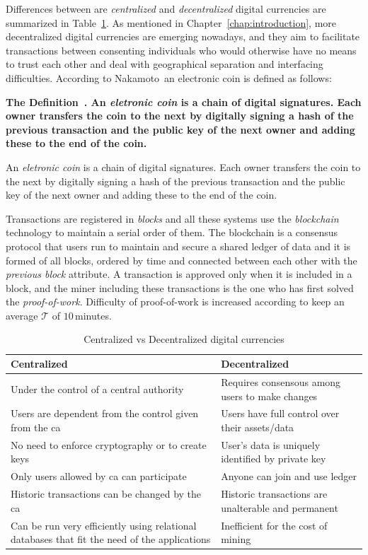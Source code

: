 \documentclass[USenglish]{uit-thesis}
\newcommand{\definition}[1]{%
  \refstepcounter{definition}%
  \par\noindent\textbf{The Definition~\thedefinition. #1}%
  \addcontentsline{def}{definition}
    {\protect\numberline{\thechapter.\thedefinition}#1}\par%
}
\begin{document}
Differences between are \emph{centralized}
and \emph{decentralized} digital currencies
are summarized in Table~\ref{tab:centralized_vs_decentralized}.
As mentioned in Chapter~\ref{chap:introduction}, more decentralized
digital currencies are emerging nowadays, and they aim
to facilitate transactions between consenting individuals who would otherwise
have no means to trust each other and deal with geographical separation and 
interfacing difficulties.
According to Nakamoto\,\cite{Nakamoto_bitcoin} an electronic coin is defined as
follows:
\definition{An \emph{eletronic coin} is a chain of digital signatures.
	Each owner transfers the coin to the next by digitally signing a hash of
	the previous transaction and the public key of the next owner and adding
	these to the end of the coin.}
Transactions are registered in \emph{blocks} and all these systems use the
\emph{blockchain} technology to maintain a serial order of them.
The blockchain is a consensus protocol that users run to maintain and secure a
shared ledger of data and it is formed of all blocks, ordered by time and connected
between each other with the \emph{previous block} attribute. A transaction is approved
only when it is included in a block, and the miner including these transactions is
the one who has first
solved the \emph{proof-of-work}. Difficulty of proof-of-work is increased
according to keep an average $\mathcal{T}$ of $10$\,minutes.
\begin{table}
	\caption{Centralized vs Decentralized digital currencies}
	\label{tab:centralized_vs_decentralized}
	\centering 
	\begin{tabular}{|p{5.8cm}|p{5.8cm}|}\hline
		\textbf{Centralized}&\textbf{Decentralized}\\
		\hline
		Under the control of a central authority & Requires
		consensous among users to make changes\\
		\hline
		Users are dependent from the control given from the
		\gls{ca} & Users have full control over their assets/data\\
		\hline
		No need to enforce cryptography or to create keys & User’s data is uniquely identified by private key \\
		\hline
		Only users allowed by \gls{ca} can participate & Anyone can join and use ledger \\
		\hline
		Historic transactions can be changed by the \gls{ca} &
		Historic transactions are unalterable and permanent\\
		\hline
		Can be run very efficiently using relational
		databases that fit the need of the applications & Inefficient
		for the cost of mining \\
		\hline		
	\end{tabular}
\end{table}
\end{document}
